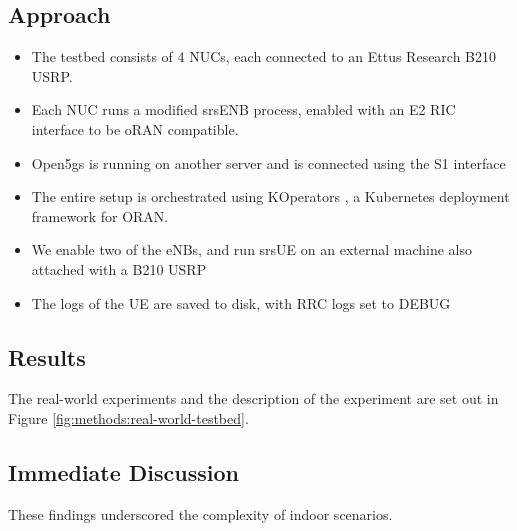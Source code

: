 \subsection{Approach}
\begin{itemize}
    \item The testbed consists of 4 NUCs, each connected to an Ettus Research B210 USRP. 
    \item Each NUC runs a modified srsENB process, enabled with an E2 RIC interface to be oRAN compatible. 
    \item Open5gs is running on another server and is connected using the S1 interface
    \item The entire setup is orchestrated using KOperators , a Kubernetes deployment framework for ORAN.
    \item We enable two of the eNBs, and run srsUE on an external machine also attached with a B210 USRP
    \item The logs of the UE are saved to disk, with RRC logs set to DEBUG
\end{itemize}
\subsection{Results}
The real-world experiments and the description of the experiment are set out in Figure \ref{fig:methods:real-world-testbed}.
\subsection{Immediate Discussion}
These findings underscored the complexity of indoor scenarios.

